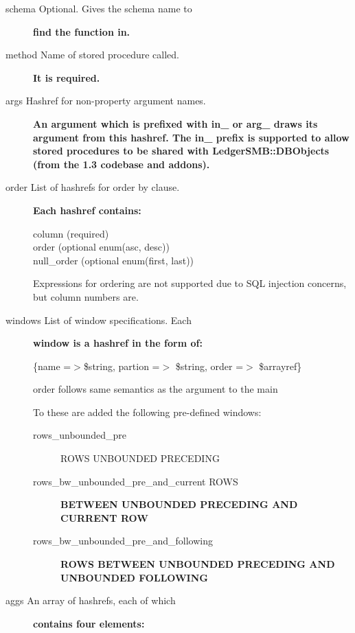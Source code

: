 \begin{description}
\begin{description}
\begin{description}
\begin{description}
\begin{description}
\begin{description}
\begin{description}
\begin{description}
\item[{schema Optional. Gives the schema name to}] \textbf{find the function in.}
\item[{method Name of stored procedure called.}] \textbf{It is required.}
\item[{args Hashref for non-property argument names.}] \textbf{An argument which is prefixed with in\_ or arg\_ draws its argument from this hashref. The in\_ prefix is supported to allow stored procedures to be shared with LedgerSMB::DBObjects (from the 1.3 codebase and addons).}
\item[{order List of hashrefs for order by clause.}] \textbf{Each hashref contains:}\begin{description}

\item[{column (required)}] \mbox{}
\item[{order (optional enum(asc, desc))}] \mbox{}
\item[{null\_order (optional enum(first, last))}] \mbox{}\end{description}


Expressions for ordering are not supported due to SQL injection concerns, but
column numbers are.


\item[{windows List of window specifications. Each}] \textbf{window is a hashref in the form of:}

\{name =$>$\$string, partion =$>$ \$string, order =$>$ \$arrayref\}



order follows same semantics as the argument to the main



To these are added the following pre-defined windows:

\begin{description}

\item[{rows\_unbounded\_pre}] \mbox{}

ROWS UNBOUNDED PRECEDING


\item[{rows\_bw\_unbounded\_pre\_and\_current ROWS}] \textbf{BETWEEN UNBOUNDED PRECEDING AND CURRENT ROW}
\item[{rows\_bw\_unbounded\_pre\_and\_following}] \textbf{ROWS BETWEEN UNBOUNDED PRECEDING AND UNBOUNDED FOLLOWING}\end{description}

\item[{aggs An array of hashrefs, each of which}] \textbf{contains four elements:}\begin{description}


\end{description}
\end{description}
\end{description}
\end{description}
\end{description}
\end{description}
\end{description}
\end{description}
\end{description}
